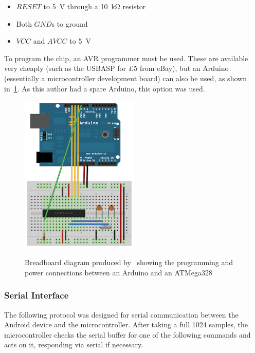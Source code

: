 \begin{itemize}
  \item $RESET$ to \SI{5}{\volt} through a \SI{10}{\kilo\ohm} resistor
  \item Both $GND$s to ground
  \item $VCC$ and $AVCC$ to \SI{5}{\volt}
\end{itemize}

To program the chip, an AVR programmer must be used. These are available very
cheaply (such as the USBASP for \pounds 5 from eBay), but an Arduino
(essentially a microcontroller development board) can also be used, as shown
in~\cref{fig:arduino_programmer}. As this author had a spare Arduino, this
option was used.

\begin{figure}
  \centering
  \includegraphics[width=0.5\textwidth]{img/microcontroller/arduino_programmer.png}
  \label{fig:arduino_programmer}
  \caption[Arduino as a Programmer]{Breadboard diagram produced by~\textcite{ArduinoProgrammer} showing
  the programming and power connections between an Arduino and an ATMega328}
\end{figure}


\subsubsection{Serial Interface}

The following protocol was designed for serial communication between the Android
device and the microcontroller. After taking a full 1024 samples, the
microcontroller checks the serial buffer for one of the following commands and
acts on it, responding via serial if necessary.

